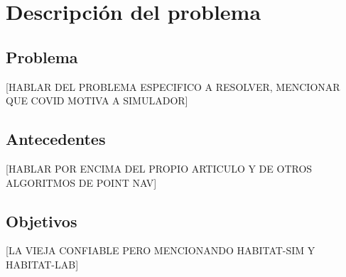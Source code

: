 \chapter{Descripción del problema}



\section{Problema}
[HABLAR DEL PROBLEMA ESPECIFICO A RESOLVER, MENCIONAR QUE COVID MOTIVA A SIMULADOR]

\section{Antecedentes}
[HABLAR POR ENCIMA DEL PROPIO ARTICULO Y DE OTROS ALGORITMOS DE POINT NAV]

\section{Objetivos}
[LA VIEJA CONFIABLE PERO MENCIONANDO HABITAT-SIM Y HABITAT-LAB]